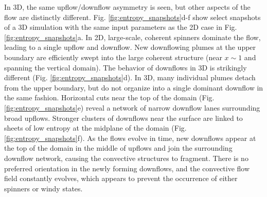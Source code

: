 In 3D, the same upflow/downflow asymmetry is seen, but other aspects of the flow are distinctly different.  
Fig. \ref{fig:entropy_snapshots}d-f show select snapshots of a 3D simulation with the same input parameters as the 2D case in Fig. \ref{fig:entropy_snapshots}a.
In 2D, large-scale, coherent spinners dominate the  flow, leading to a single upflow and downflow.  
New downflowing plumes at the upper boundary are efficiently swept into the large coherent structure (near $x \sim 1$ and spanning the vertical domain).  
The behavior of downflows in 3D is strikingly different (Fig. \ref{fig:entropy_snapshots}d).
In 3D, many individual plumes detach from the upper boundary, but do not organize into a single dominant downflow in the same fashion.  
Horizontal cuts near the top of the domain (Fig. \ref{fig:entropy_snapshots}e) reveal a network of narrow downflow lanes surrounding broad upflows. 
Stronger clusters of downflows near the surface are linked to sheets of low entropy at the midplane of the domain (Fig. \ref{fig:entropy_snapshots}f).
As the flows evolve in time, new downflows appear at the top of the domain in the middle of upflows and join the surrounding downflow network, causing the convective structures to fragment.  
There is no preferred orientation in the newly forming downflows, and the convective flow field constantly evolves, which appears to prevent the occurrence of either spinners or windy states.




